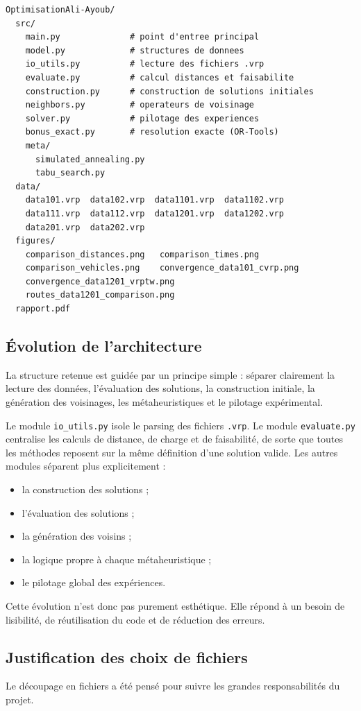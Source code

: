 \documentclass[11pt,a4paper]{article}
\begin{document}
\begin{lstlisting}
OptimisationAli-Ayoub/
  src/
    main.py              # point d'entree principal
    model.py             # structures de donnees
    io_utils.py          # lecture des fichiers .vrp
    evaluate.py          # calcul distances et faisabilite
    construction.py      # construction de solutions initiales
    neighbors.py         # operateurs de voisinage
    solver.py            # pilotage des experiences
    bonus_exact.py       # resolution exacte (OR-Tools)
    meta/
      simulated_annealing.py
      tabu_search.py
  data/
    data101.vrp  data102.vrp  data1101.vrp  data1102.vrp
    data111.vrp  data112.vrp  data1201.vrp  data1202.vrp
    data201.vrp  data202.vrp
  figures/
    comparison_distances.png   comparison_times.png
    comparison_vehicles.png    convergence_data101_cvrp.png
    convergence_data1201_vrptw.png
    routes_data1201_comparison.png
  rapport.pdf
\end{lstlisting}

\subsection{Évolution de l'architecture}
La structure retenue est guidée par un principe simple : séparer clairement la lecture des données, l'évaluation des solutions, la construction initiale, la génération des voisinages, les métaheuristiques et le pilotage expérimental.

Le module \texttt{io\_utils.py} isole le parsing des fichiers \texttt{.vrp}. Le module \texttt{evaluate.py} centralise les calculs de distance, de charge et de faisabilité, de sorte que toutes les méthodes reposent sur la même définition d'une solution valide. Les autres modules séparent plus explicitement :
\begin{itemize}
    \item la construction des solutions ;
    \item l'évaluation des solutions ;
    \item la génération des voisins ;
    \item la logique propre à chaque métaheuristique ;
    \item le pilotage global des expériences.
\end{itemize}

Cette évolution n'est donc pas purement esthétique. Elle répond à un besoin de lisibilité, de réutilisation du code et de réduction des erreurs.

\subsection{Justification des choix de fichiers}
Le découpage en fichiers a été pensé pour suivre les grandes responsabilités du projet.
\end{document}
